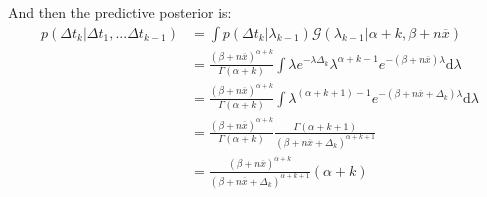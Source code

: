 \documentclass[smallextended]{svjour3}          %
\begin{document}
And then the predictive posterior is:
\begin{align}
p(\Delta t_k | \Delta t_1,...\Delta t_{k-1})&=
\int
p(\Delta t_k | \lambda_{k-1})
\mathcal{G}(\lambda_{k-1} | \alpha+k, \beta + n\overline{x})\\
&=
\frac{(\beta+n\overline{x})^{\alpha+k}}{\Gamma(\alpha+k)}
\int
\lambda e^{-\lambda \Delta_k}
\lambda^{\alpha+k-1}
e^{-(\beta+n\overline{x})\lambda}
\text{d}\lambda\\
&=
\frac{(\beta+n\overline{x})^{\alpha+k}}{\Gamma(\alpha+k)}
\int
\lambda^{(\alpha+k+1)-1}
e^{-(\beta+n\overline{x}+\Delta_k)\lambda}
\text{d}\lambda\\
&=
\frac{(\beta+n\overline{x})^{\alpha+k}}{\Gamma(\alpha+k)}
\frac{\Gamma(\alpha+k+1)}{(\beta+n\overline{x}+\Delta_k)^{\alpha+k+1}}\\
&=
\frac
{(\beta+n\overline{x})^{\alpha+k}}{(\beta+n\overline{x}+\Delta_k)^{\alpha+k+1}}
(\alpha+k)
\end{align}


 
% 
% 

\end{document}
